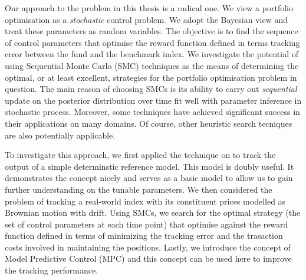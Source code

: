 Our approach to the problem in this thesis is a radical one. We view a portfolio optimisation as a \emph{stochastic} control problem. We adopt the Bayesian view and treat these parameters as random variables. The objective is to find the sequence of control parameters that optimise the reward function defined in terms tracking error between the fund and the benchmark index. We investigate the potential of using Sequential Monte Carlo (SMC) techniques as the means of determining the optimal, or at least excellent, strategies for the portfolio optimisation problem in question. The main reason of choosing SMCs is its ability to carry out \emph{sequential} update on the posterior distribution over time fit well with parameter inference in stochastic process. Moreover, some techniques have achieved significant success in their applications on many domains. Of course, other heuristic search tecniques are also potentially applicable.

To investigate this approach, we first applied the technique on to track the output of a simple determinstic reference model. This model is doubly useful. It demonstrates the concept nicely and serves as a basic model to allow us to gain further understanding on the tunable parameters. We then considered the problem of tracking a real-world index with its constituent prices modelled as Brownian motion with drift. Using SMCs, we search for the optimal strategy (the set of control parameters at each time point) that optimise against the reward function defined in terms of minimizing the tracking error and the trasaction costs involved in maintaining the positions. Lastly, we introduce the concept of Model Predictive Control (MPC) and this concept can be used here to improve the tracking performance.


